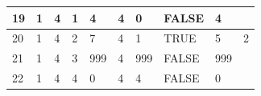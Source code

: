 \begin{table}[h!]
\begin{tabular}{|l|l|l|l|l|l|l|l|l|l|}
		19                                                          & 1                                                       & 4                                                       & 1                                                       & 4                                                                        & 4                                                                        & 0                                                                        & FALSE                                                           & 4                                                                        &                                                               \\ \hline
		\rowcolor[HTML]{FCFF2F} 
		20                                                          & 1                                                       & 4                                                       & 2                                                       & 7                                                                        & 4                                                                        & 1                                                                        & TRUE                                                            & 5                                                                        & 2                                                             \\ \hline
		21                                                          & 1                                                       & 4                                                       & 3                                                       & 999                                                                      & 4                                                                        & 999                                                                      & FALSE                                                           & 999                                                                      &                                                               \\ \hline
		22                                                          & 1                                                       & 4                                                       & 4                                                       & 0                                                                        & 4                                                                        & 4                                                                        & FALSE                                                           & 0                                                                        &                                                               \\ \hline

\end{tabular}
\end{table}
